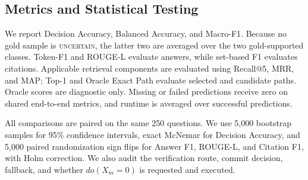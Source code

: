 \subsection{Metrics and Statistical Testing}

We report Decision Accuracy, Balanced Accuracy, and Macro-F1. Because no gold
sample is \textsc{uncertain}, the latter two are averaged over the two
gold-supported classes. Token-F1 and ROUGE-L evaluate answers, while set-based
F1 evaluates citations. Applicable retrieval components are evaluated using
Recall@5, MRR, and MAP; Top-1 and Oracle Exact Path evaluate selected and
candidate paths. Oracle scores are diagnostic only. Missing or failed
predictions receive zero on shared end-to-end metrics, and runtime is averaged
over successful predictions.

All comparisons are paired on the same 250 questions. We use 5,000 bootstrap
samples for 95\% confidence intervals, exact McNemar for Decision Accuracy, and
5,000 paired randomization sign flips for Answer F1, ROUGE-L, and Citation F1,
with Holm correction. We also audit the verification route, commit decision,
fallback, and whether $do(X_m=0)$ is requested and executed.
